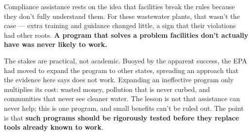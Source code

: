 \documentclass[
  11pt,
]{article}
\newcommand{\sectionhead}[1]{%
  \vspace{2pt}{\color{ink}\bfseries\fontsize{9.75pt}{12pt}\selectfont
  \textls[20]{\MakeUppercase{#1}}\par}\vspace{1pt}}
\begin{document}
\vspace{8pt}

\sectionhead{Takeaway}
\noindent Compliance assistance rests on the idea that facilities break the rules because they don't fully understand them. For these wastewater plants, that wasn't the case --- extra training and guidance changed little, a sign that their violations had other roots. \textbf{A program that solves a problem facilities don't actually have was never likely to work.}

\vspace{4pt}

\noindent The stakes are practical, not academic. Buoyed by the apparent success, the EPA had moved to expand the program to other states, spreading an approach that the evidence here says does not work. Expanding an ineffective program only multiplies its cost: wasted money, pollution that is never curbed, and communities that never see cleaner water. The lesson is not that assistance can never help; this is one program, and small benefits can't be ruled out. The point is that \textbf{such programs should be rigorously tested before they replace tools already known to work}.
\end{document}

